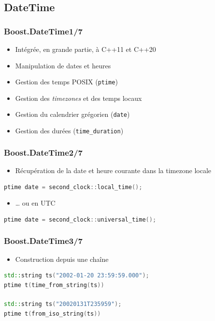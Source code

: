 \documentclass[C++.tex]{subfiles}
\begin{document}
\subsection*{DateTime}
\begin{frame}[fragile]
	\frametitle{Boost.DateTime\titlehfill{}1/7}
	\begin{itemize}
		\item Intégrée, en grande partie, à C++11 et C++20
		\item Manipulation de dates et heures
		\item Gestion des temps POSIX (\lstinline|ptime|)
		\item Gestion des \textit{timezones} et des temps locaux
		\item Gestion du calendrier grégorien (\lstinline|date|)
		\item Gestion des durées (\lstinline|time_duration|)
	\end{itemize}
\end{frame}

\begin{frame}[fragile]
	\frametitle{Boost.DateTime\titlehfill{}2/7}
	\begin{itemize}
		\item Récupération de la date et heure courante dans la timezone locale
	\end{itemize}

	\begin{lstlisting}[language=C++]
ptime date = second_clock::local_time();\end{lstlisting}

	\begin{itemize}
		\item \ldots{} ou en UTC
	\end{itemize}

	\begin{lstlisting}[language=C++]
ptime date = second_clock::universal_time();\end{lstlisting}
\end{frame}

\begin{frame}[fragile]
	\frametitle{Boost.DateTime\titlehfill{}3/7}
	\begin{itemize}
		\item Construction depuis une chaîne
	\end{itemize}

	\begin{lstlisting}[language=C++]
std::string ts("2002-01-20 23:59:59.000");
ptime t(time_from_string(ts))

std::string ts("20020131T235959");
ptime t(from_iso_string(ts))\end{lstlisting}
\end{frame}
\end{document}
